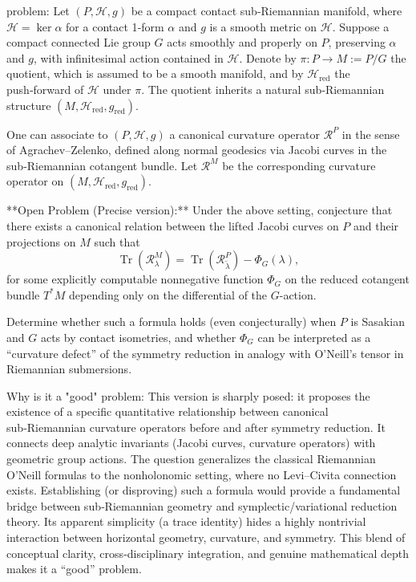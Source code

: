 problem:  
Let \((P, \mathcal{H}, g)\) be a compact contact sub‑Riemannian manifold, where \(\mathcal{H} = \ker \alpha\) for a contact 1‑form \(\alpha\) and \(g\) is a smooth metric on \(\mathcal{H}\).  
Suppose a compact connected Lie group \(G\) acts smoothly and properly on \(P\), preserving \(\alpha\) and \(g\), with infinitesimal action contained in \(\mathcal{H}\). Denote by \(\pi : P \to M := P/G\) the quotient, which is assumed to be a smooth manifold, and by \(\mathcal{H}_{\mathrm{red}}\) the push‑forward of \(\mathcal{H}\) under \(\pi\). The quotient inherits a natural sub‑Riemannian structure \((M, \mathcal{H}_{\mathrm{red}}, g_{\mathrm{red}})\).  

One can associate to \((P, \mathcal{H}, g)\) a canonical curvature operator \(\mathcal{R}^{P}\) in the sense of Agrachev–Zelenko, defined along normal geodesics via Jacobi curves in the sub‑Riemannian cotangent bundle. Let \(\mathcal{R}^{M}\) be the corresponding curvature operator on \((M, \mathcal{H}_{\mathrm{red}}, g_{\mathrm{red}})\).

**Open Problem (Precise version):**  
Under the above setting, conjecture that there exists a canonical relation between the lifted Jacobi curves on \(P\) and their projections on \(M\) such that  
\[
\operatorname{Tr}(\mathcal{R}^{M}_\lambda) = \operatorname{Tr}(\mathcal{R}^{P}_{\tilde{\lambda}}) - \Phi_G(\lambda),
\]
for some explicitly computable nonnegative function \(\Phi_G\) on the reduced cotangent bundle \(T^*M\) depending only on the differential of the \(G\)-action.  

Determine whether such a formula holds (even conjecturally) when \(P\) is Sasakian and \(G\) acts by contact isometries, and whether \(\Phi_G\) can be interpreted as a “curvature defect” of the symmetry reduction in analogy with O’Neill’s tensor in Riemannian submersions.

Why is it a "good" problem:  
This version is sharply posed: it proposes the existence of a specific quantitative relationship between canonical sub‑Riemannian curvature operators before and after symmetry reduction. It connects deep analytic invariants (Jacobi curves, curvature operators) with geometric group actions. The question generalizes the classical Riemannian O’Neill formulas to the nonholonomic setting, where no Levi–Civita connection exists. Establishing (or disproving) such a formula would provide a fundamental bridge between sub‑Riemannian geometry and symplectic/variational reduction theory. Its apparent simplicity (a trace identity) hides a highly nontrivial interaction between horizontal geometry, curvature, and symmetry. This blend of conceptual clarity, cross‑disciplinary integration, and genuine mathematical depth makes it a “good” problem.